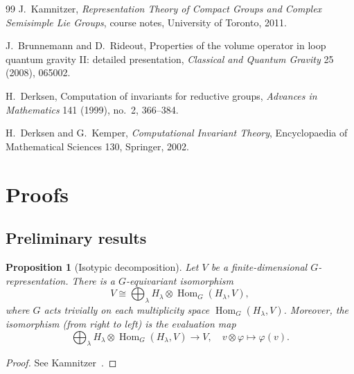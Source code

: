 \documentclass[11pt]{article}
\newcommand{\HomG}[2]{\operatorname{Hom}_G\!\left(#1,#2\right)}
\newtheorem{proposition}[theorem]{Proposition}
\theoremstyle{definition}
\begin{document}
\begin{thebibliography}{99}
  J.~Kamnitzer,
  \emph{Representation Theory of Compact Groups and Complex Semisimple Lie Groups},
  course notes, University of Toronto, 2011.

  J.~Brunnemann and D.~Rideout,
  Properties of the volume operator in loop quantum gravity II: detailed presentation,
  \emph{Classical and Quantum Gravity} 25 (2008), 065002.

  H.~Derksen,
  Computation of invariants for reductive groups,
  \emph{Advances in Mathematics} 141 (1999), no.~2, 366--384.

  H.~Derksen and G.~Kemper,
  \emph{Computational Invariant Theory},
  Encyclopaedia of Mathematical Sciences 130,
  Springer, 2002.

\end{thebibliography}

\appendix

\section{Proofs}\label{sec:appendix-proofs}

\subsection{Preliminary results}


\begin{proposition}[Isotypic decomposition]\label{prop:isotypic-decomposition}
  Let $V$ be a finite-dimensional $G$-representation.
  There is a $G$-equivariant isomorphism
  \[
    V
    \cong
    \bigoplus_{\lambda}
    H_\lambda\otimes \HomG{H_\lambda}{V},
  \]
  where $G$ acts trivially on each multiplicity space $\HomG{H_\lambda}{V}$.
  Moreover, the isomorphism (from right to left) is the evaluation map
  \[
    \bigoplus_{\lambda}
    H_\lambda\otimes \HomG{H_\lambda}{V}
    \longrightarrow
    V,
    \quad
    v\otimes \varphi \longmapsto \varphi(v).
  \]
\end{proposition}
\begin{proof}
  See Kamnitzer~\cite[Theorem~1.10 and its proof]{Kamnitzer2011}.
\end{proof}
\end{document}

